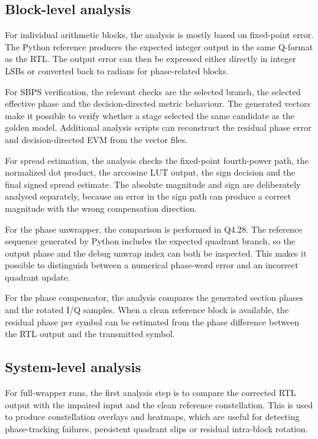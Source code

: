 \subsection{Block-level analysis}

For individual arithmetic blocks, the analysis is mostly based on fixed-point error. The Python reference produces the expected integer output in the same Q-format as the RTL. The output error can then be expressed either directly in integer LSBs or converted back to radians for phase-related blocks.

For \ac{SBPS} verification, the relevant checks are the selected branch, the selected effective phase and the decision-directed metric behaviour. The generated vectors make it possible to verify whether a stage selected the same candidate as the golden model. Additional analysis scripts can reconstruct the residual phase error and decision-directed EVM from the vector files.

For spread estimation, the analysis checks the fixed-point fourth-power path, the normalized dot product, the arccosine \ac{LUT} output, the sign decision and the final signed spread estimate. The absolute magnitude and sign are deliberately analysed separately, because an error in the sign path can produce a correct magnitude with the wrong compensation direction.

For the phase unwrapper, the comparison is performed in Q4.28. The reference sequence generated by Python includes the expected quadrant branch, so the output phase and the debug unwrap index can both be inspected. This makes it possible to distinguish between a numerical phase-word error and an incorrect quadrant update.

For the phase compensator, the analysis compares the generated section phases and the rotated \ac{I/Q} samples. When a clean reference block is available, the residual phase per symbol can be estimated from the phase difference between the RTL output and the transmitted symbol.

\subsection{System-level analysis}

For full-wrapper runs, the first analysis step is to compare the corrected RTL output with the impaired input and the clean reference constellation. This is used to produce constellation overlays and heatmaps, which are useful for detecting phase-tracking failures, persistent quadrant slips or residual intra-block rotation.

